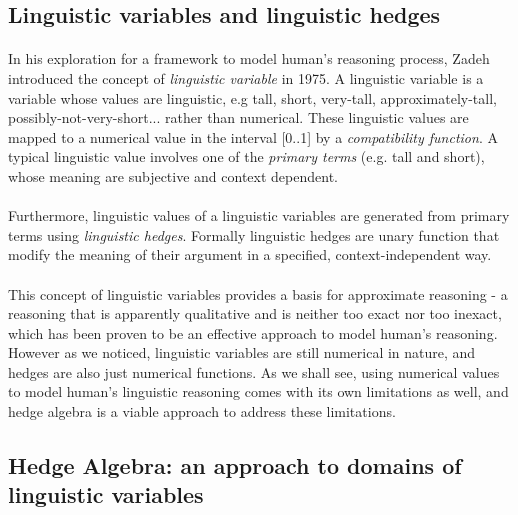 \documentclass[../gr-final.tex]{subfiles}
\begin{document}
\subsection{Linguistic variables and linguistic hedges}
\paragraph{} In his exploration for a framework to model human's
reasoning process, Zadeh introduced the concept of {\em linguistic
variable} in 1975. A linguistic
variable is a variable whose values are linguistic, e.g tall,
short, very-tall, approximately-tall, possibly-not-very-short...
rather than numerical. These linguistic values are mapped to a
numerical value in the interval [0..1] by a {\em compatibility
function}. A typical linguistic value involves one of the {\em
primary terms} (e.g. tall and short), whose meaning are
subjective and context dependent.
\paragraph{} Furthermore, linguistic values of a linguistic
variables are generated from primary terms using {\em linguistic
hedges}. Formally linguistic hedges are unary function that
modify the meaning of their argument in a specified,
context-independent way.
\paragraph{} This concept of linguistic variables provides a
basis for approximate reasoning - a reasoning that is apparently
qualitative and is neither too exact nor too inexact, which has
been proven to be an effective approach to model human's
reasoning. However as we noticed, linguistic variables are still
numerical in nature, and hedges are also just numerical
functions. As we shall see, using numerical values to model
human's linguistic reasoning comes with its own limitations as
well, and hedge algebra is a viable approach to address these
limitations.
\subsection{Hedge Algebra: an approach to domains of linguistic
variables}
\end{document}
